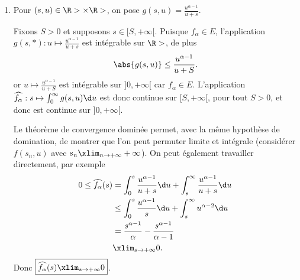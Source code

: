\begin{enonce}
\begin{solution}
\begin{enumerate}
De plus,
\begin{equation*}
    \abs*{\frac{f_\alpha(u)}{u+s}}\underset{u\to +\infty}\sim u^{\alpha-2},
\end{equation*}
donc $\frac{f_\alpha(u)}{u+s}$ est intégrable au voisinage de $+\infty$ si et seulement si $\alpha-2<-1$, c'est-à-dire $\alpha<1$.

En conclusion $f_\alpha\in E$ si et seulement si $0<\alpha<1$.

\item
Pour $(s,u)\in \R>\times\R>$, on pose $g(s,u)=\frac{u^{\alpha-1}}{u+s}$.

Fixons $S>0$ et supposons $s\in[S,+\infty[$.
Puisque $f_\alpha\in E$, l'application $g(s,*):u\mapsto \frac{u^{\alpha-1}}{u+s}$ est intégrable sur $\R>$, de plus
\begin{equation*}
\abs{g(s,u)}\le \frac{u^{\alpha-1}}{u+S}.
\end{equation*}
or $u\mapsto\frac{u^{\alpha-1}}{u+S}$ est intégrable sur $]0,+\infty[$ car $f_\alpha\in E$. L'application $\widehat{f_\alpha}:s\mapsto \int_0^\infty g(s,u)\d u$ est donc continue sur $[S,+\infty[$, pour tout $S>0$, et donc est continue sur $]0,+\infty[$.

Le théorème de convergence dominée permet, avec la même hypothèse de domination, de montrer que l'on peut permuter limite et intégrale (considérer $f(s_n,u)$ avec $s_n\xlim_{n\to+\infty} +\infty$). On peut également travailler directement, par exemple
\begin{align*}
0\le \widehat{f_\alpha}(s)
    &=\int_0^s \frac{u^{\alpha-1}}{u+s}\d u + \int_s^\infty\frac{u^{\alpha-1}}{u+s}\d u \\
    &\le \int_0^s \frac{u^{\alpha-1}}{s}\d u +\int_s^\infty u^{\alpha-2}\d u\\
    &= \frac{s^{\alpha-1}}{\alpha} - \frac{s^{\alpha-1}}{\alpha-1}\\
    &\xlim_{s\to+\infty} 0.
\end{align*}
Donc $\boxed{\widehat{f_\alpha}(s)\xlim_{s\to+\infty} 0}$.

\end{enumerate}
\end{solution}
\end{enonce}
